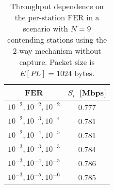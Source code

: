 \documentclass[10pt,onecolumn,a4paper]{IEEEtran}
\begin{document}
\clearpage
\begin{table}\caption{Throughput dependence on the per-station FER in a scenario with $N=9$
contending stations using the 2-way mechanism without capture.
Packet size is $E[PL]=1024$ bytes.}
\begin{center}
\begin{tabular}{c|c}
\hline \hline  FER & $S_i$~[Mbps]\\ \hline \hline
 $10^{-2}, 10^{-2}, 10^{-2}$ & 0.777\\
\hline
 $10^{-2}, 10^{-3}, 10^{-4}$ & 0.781 \\
\hline
$10^{-2}, 10^{-4}, 10^{-5}$ & 0.781 \\
\hline \hline
 $10^{-3}, 10^{-3}, 10^{-3}$ & 0.784  \\
\hline
 $10^{-3}, 10^{-4}, 10^{-5}$ & 0.786 \\
\hline
 $10^{-3}, 10^{-5}, 10^{-6}$ & 0.785 \\
\hline \hline
\end{tabular}
 \label{tab.throughput_per}
\end{center}
\end{table}
\end{document}
